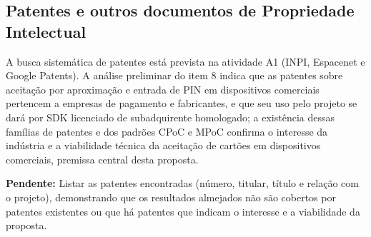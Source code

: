 \documentclass[12pt,a4paper]{article}
\newcommand{\pendente}[1]{\begin{pendbox}\textbf{\color{pendfg}Pendente:} #1\end{pendbox}}
\begin{document}
\subsection{Patentes e outros documentos de Propriedade Intelectual}

A busca sistemática de patentes está prevista na atividade A1 (INPI, Espacenet e Google Patents). A análise preliminar do item 8 indica que as patentes sobre aceitação por aproximação e entrada de PIN em dispositivos comerciais pertencem a empresas de pagamento e fabricantes, e que seu uso pelo projeto se dará por SDK licenciado de subadquirente homologado; a existência dessas famílias de patentes e dos padrões CPoC e MPoC \cite{pci_cpoc, pci_mpoc} confirma o interesse da indústria e a viabilidade técnica da aceitação de cartões em dispositivos comerciais, premissa central desta proposta.

\pendente{Listar as patentes encontradas (número, titular, título e relação com o projeto), demonstrando que os resultados almejados não são cobertos por patentes existentes ou que há patentes que indicam o interesse e a viabilidade da proposta.}
\end{document}
